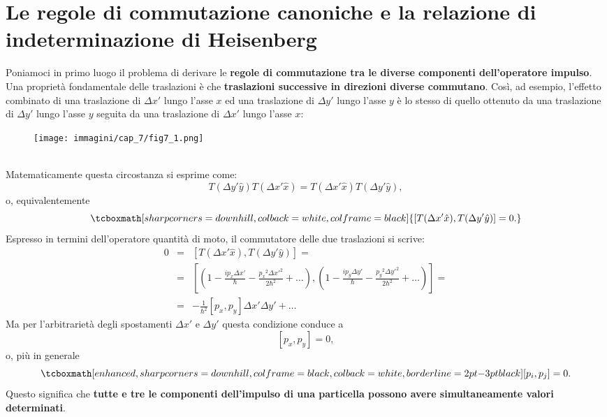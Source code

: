 \section[Le regole di commutazione canoniche e la relazione di indeterminazione di Heisenberg]{Le regole di commutazione canoniche e la relazione di indeterminazione di Heisenberg}
Poniamoci in primo luogo il problema di derivare le \textbf{regole di commutazione tra le diverse componenti dell'operatore impulso}.\\
Una proprietà fondamentale delle traslazioni è che \textbf{traslazioni successive in direzioni diverse commutano}. Così, ad esempio, l'effetto combinato di una traslazione di $\Delta x'$ lungo l'asse $x$ ed una traslazione di $\Delta y'$ lungo l'asse $y$ è lo stesso di quello ottenuto da una traslazione di $\Delta y'$ lungo l'asse $y$ seguita da una traslazione di $\Delta x'$ lungo l'asse $x$:\\
\begin{figure}[!htbp]
\begin{center}
\texttt{[image: immagini/cap\_7/fig7\_1.png]}
\end{center}
\end{figure}\\
Matematicamente questa circostanza si esprime come:
	\begin{equation}
		T(\Delta y'\hat{y})T(\Delta x'\hat{x})= T(\Delta x'\hat{x})T(\Delta y'\hat{y}),
	\end{equation}
o, equivalentemente
	\begin{equation}
		\tcboxmath[sharp corners=downhill, colback=white, colframe=black]{
			\left[ T(\Delta x'\hat{x}), T(\Delta y'\hat{y})\right] =0.
			}
	\end{equation}
Espresso in termini dell'operatore quantità di moto, il commutatore delle due traslazioni si scrive:
	\begin{eqnarray}
		0 & = & \left[ T(\Delta x'\hat{x}), T(\Delta y'\hat{y})\right] =   \nonumber \\
		 & = & \left[\left( 1-\frac{i p_x \Delta x'}{\hbar}-\frac{ {p_x} ^2 {\Delta x'}^2}{2\hbar ^2}+\dots \right), \left( 1-\frac{i p_y \Delta y'}{\hbar}-\frac{ {p_y} ^2 {\Delta y'}^2}{2\hbar ^2}+\dots\right) \right] = \nonumber  \\
		& = & -\frac{1}{\hbar ^2}\left[p_x, p_y \right]\Delta x' \Delta y' + \dots
	\end{eqnarray}
Ma per l'arbitrarietà degli spostamenti $\Delta x'$ e  $\Delta y'$ questa condizione conduce a
	\begin{equation}
		\left[p_x , p_y\right] =0,
	\end{equation}
o, più in generale
	\begin{equation}
		\tcboxmath[enhanced, sharp corners=downhill, colframe=black, colback=white, borderline={2pt}{-3pt}{black}]{
			\left[p_i , p_j\right] =0.
			}
	\end{equation}
Questo significa che \textbf{tutte e tre le componenti dell'impulso di una particella possono avere simultaneamente valori determinati}.\\

